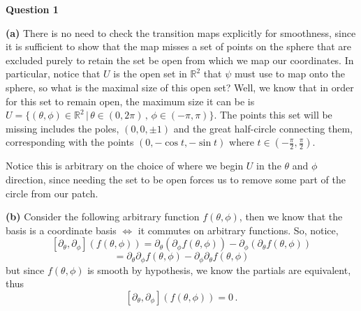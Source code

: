 \documentclass[10pt]{article}
\newcommand{\R}{\mathbb{R}}
\begin{document}
\textbf{Question 1}

\textbf{(a)} There is no need to check the transition maps explicitly for smoothness, since it is sufficient to show that the map misses a set of points on the sphere that are excluded purely to retain the set be open from which we map our coordinates. In particular, notice that $U$ is the open set in $\R^{2}$ that $\psi$ must use to map onto the sphere, so what is the maximal size of this open set? Well, we know that in order for this set to remain open, the maximum size it can be is $U = \{(\theta,\phi)\in \R^{2} \,|\, \theta \in (0, 2\pi)\, ,\, \phi \in (-\pi, \pi )\}$. The points this set will be missing includes the poles, $(0,0,\pm 1)$ and the great half-circle connecting them, corresponding with the points $(0,-\cos t, -\sin t)$ where $t\in (-\frac{\pi}{2}, \frac{\pi}{2})$.

Notice this is arbitrary on the choice of where we begin $U$ in the $\theta$ and $\phi$ direction, since needing the set to be open forces us to remove some part of the circle from our patch.

\textbf{(b)} Consider the following arbitrary function $f(\theta,\phi)$, then we know that the basis is a coordinate basis $\iff$ it commutes on arbitrary functions. So, notice,
\[ [\partial_{\theta},\partial_{\phi}](f(\theta,\phi)) = \partial_{\theta}\left(\partial_{\phi}f(\theta,\phi)\right) - \partial_{\phi}\left(\partial_{\theta}f(\theta,\phi)\right) \]
\[ = \partial_{\theta}\partial_{\phi}f(\theta,\phi) - \partial_{\phi}\partial_{\theta}f(\theta,\phi) \]
but since $f(\theta,\phi)$ is smooth by hypothesis, we know the partials are equivalent, thus
\[ [\partial_{\theta},\partial_{\phi}](f(\theta,\phi)) = 0\, . \]
\end{document}
